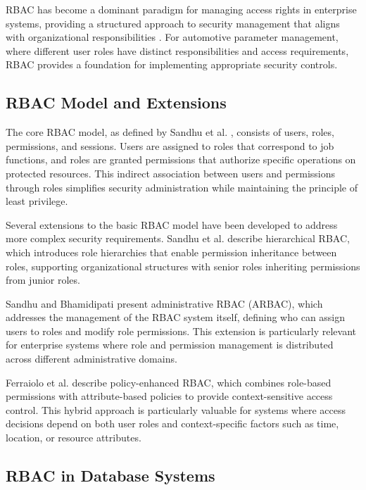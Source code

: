 \ac{RBAC} has become a dominant paradigm for managing access rights in enterprise systems, providing a structured approach to security management that aligns with organizational responsibilities \cite{sandhu1998role}. For automotive parameter management, where different user roles have distinct responsibilities and access requirements, \ac{RBAC} provides a foundation for implementing appropriate security controls.

\subsection{\ac{RBAC} Model and Extensions}
\label{subsec:rbac-model-extensions}

The core \ac{RBAC} model, as defined by Sandhu et al. \cite{sandhu1998role}, consists of users, roles, permissions, and sessions. Users are assigned to roles that correspond to job functions, and roles are granted permissions that authorize specific operations on protected resources. This indirect association between users and permissions through roles simplifies security administration while maintaining the principle of least privilege.

Several extensions to the basic \ac{RBAC} model have been developed to address more complex security requirements. Sandhu et al. \cite{sandhu1998role} describe hierarchical \ac{RBAC}, which introduces role hierarchies that enable permission inheritance between roles, supporting organizational structures with senior roles inheriting permissions from junior roles.

Sandhu and Bhamidipati \cite{sandhu1997arbac97} present administrative \ac{RBAC} (ARBAC), which addresses the management of the \ac{RBAC} system itself, defining who can assign users to roles and modify role permissions. This extension is particularly relevant for enterprise systems where role and permission management is distributed across different administrative domains.

Ferraiolo et al. \cite{ferraiolo2011policy} describe policy-enhanced \ac{RBAC}, which combines role-based permissions with attribute-based policies to provide context-sensitive access control. This hybrid approach is particularly valuable for systems where access decisions depend on both user roles and context-specific factors such as time, location, or resource attributes.

\subsection{\ac{RBAC} in Database Systems}
\label{subsec:rbac-database-systems}

